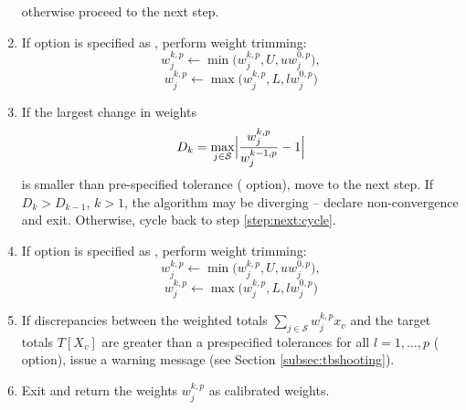 \begin{enumerate}
        otherwise proceed to the next step.
    \item If  option is specified as ,
        perform weight trimming:
        $$
            w_j^{k,p} \leftarrow \min\bigl( w_j^{k,p}, U, u w_j^{0,p} \bigr),
        $$
        $$
            w_j^{k,p} \leftarrow \max\bigl( w_j^{k,p}, L, l w_j^{0,p} \bigr)
        $$
        \label{step:trimfreq:sometimes}
    \item If the largest change in weights
        $$
            D_k = \max_{j \in \mathcal{S}}
                \Bigl| \frac{w_j^{k,p}}{w_j^{k-1,p}} - 1 \Bigr|
        $$
        is smaller than pre-specified tolerance ( option),
        move to the next step. If $D_k > D_{k-1}$, $k>1$, the algorithm
        may be diverging -- declare non-convergence and exit.
        Otherwise, cycle back to step
        \ref{step:next:cycle}.
        \label{step:check:weight:conv}
    \item If  option is specified as ,
        perform weight trimming:
        $$
            w_j^{k,p} \leftarrow \min\bigl( w_j^{k,p}, U, u w_j^{0,p} \bigr),
        $$
        $$
            w_j^{k,p} \leftarrow \max\bigl( w_j^{k,p}, L, l w_j^{0,p} \bigr)
        $$
        \label{step:trimfreq:once}
    \item If discrepancies between the weighted totals
        $\sum_{j \in \mathcal{S}} w_j^{k,p} x_v$
        and the target totals $T[X_v]$ are greater than
        a prespecified tolerances for all
        $l=1,\ldots,p$ ( option),
        issue a warning message (see Section \ref{subsec:tbshooting}).
        \label{step:check:ctotal:conv}
    \item Exit and return the weights $w_j^{k,p}$ as calibrated weights.
\end{enumerate}

